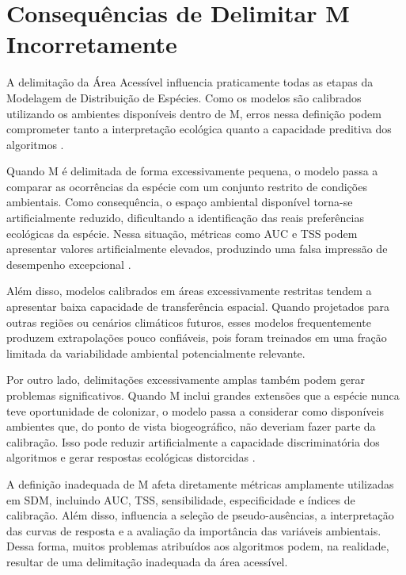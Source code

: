 \section{Consequências de Delimitar M Incorretamente}

A delimitação da Área Acessível influencia praticamente todas as etapas da Modelagem de Distribuição de Espécies. Como os modelos são calibrados utilizando os ambientes disponíveis dentro de M, erros nessa definição podem comprometer tanto a interpretação ecológica quanto a capacidade preditiva dos algoritmos \parencite{Barve2011,Peterson2011}.

Quando M é delimitada de forma excessivamente pequena, o modelo passa a comparar as ocorrências da espécie com um conjunto restrito de condições ambientais. Como consequência, o espaço ambiental disponível torna-se artificialmente reduzido, dificultando a identificação das reais preferências ecológicas da espécie. Nessa situação, métricas como AUC e TSS podem apresentar valores artificialmente elevados, produzindo uma falsa impressão de desempenho excepcional \parencite{Lobo2008,Barve2011}.

Além disso, modelos calibrados em áreas excessivamente restritas tendem a apresentar baixa capacidade de transferência espacial. Quando projetados para outras regiões ou cenários climáticos futuros, esses modelos frequentemente produzem extrapolações pouco confiáveis, pois foram treinados em uma fração limitada da variabilidade ambiental potencialmente relevante.

Por outro lado, delimitações excessivamente amplas também podem gerar problemas significativos. Quando M inclui grandes extensões que a espécie nunca teve oportunidade de colonizar, o modelo passa a considerar como disponíveis ambientes que, do ponto de vista biogeográfico, não deveriam fazer parte da calibração. Isso pode reduzir artificialmente a capacidade discriminatória dos algoritmos e gerar respostas ecológicas distorcidas \parencite{Peterson2011,Guisan2017}.

A definição inadequada de M afeta diretamente métricas amplamente utilizadas em SDM, incluindo AUC, TSS, sensibilidade, especificidade e índices de calibração. Além disso, influencia a seleção de pseudo-ausências, a interpretação das curvas de resposta e a avaliação da importância das variáveis ambientais. Dessa forma, muitos problemas atribuídos aos algoritmos podem, na realidade, resultar de uma delimitação inadequada da área acessível.

